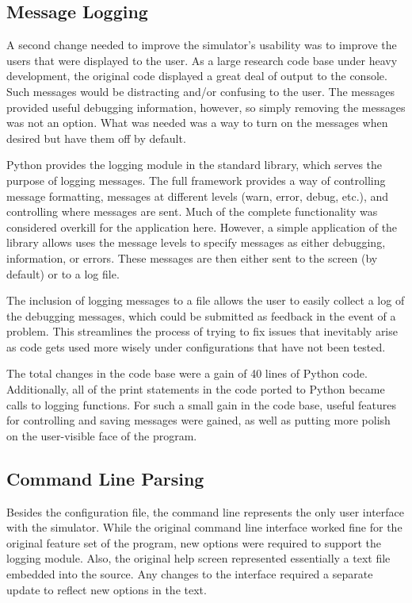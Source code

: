 \documentclass[twocolumn]{article}
\begin{document}
\subsection{Message Logging}
A second change needed to improve the simulator's usability was to improve the
users that were displayed to the user.  As a large research code base under heavy
development, the original code displayed a great deal of output to the console.
Such messages would be distracting and/or confusing to the user. The messages
provided useful debugging information, however, so simply removing the messages
was not an option. What was needed was a way to turn on the messages when desired
but have them off by default.

Python provides the logging module in the standard library, which serves the
purpose of logging messages. The full framework provides a way of controlling
message formatting, messages at different levels (warn, error, debug, etc.), and
controlling where messages are sent. Much of the complete functionality was
considered overkill for the application here. However, a simple application of
the library allows uses the message levels to specify messages as either
debugging, information, or errors. These messages are then either sent to the
screen (by default) or to a log file.

The inclusion of logging messages to a file allows the user to easily collect
a log of the debugging messages, which could be submitted as feedback in the
event of a problem. This streamlines the process of trying to fix issues that
inevitably arise as code gets used more wisely under configurations that have
not been tested.

The total changes in the code base were a gain of 40 lines of Python code.
Additionally, all of the print statements in the code ported to Python became
calls to logging functions. For such a small gain in the code base, useful
features for controlling and saving messages were gained, as well as putting
more polish on the user-visible face of the program.

\subsection{Command Line Parsing}
Besides the configuration file, the command line represents the only user
interface with the simulator. While the original command line interface
worked fine for the original feature set of the program, new options
were required to support the logging module.  Also, the original help screen
represented essentially a text file embedded into the source. Any changes to
the interface required a separate update to reflect new options in the text.
\end{document}
